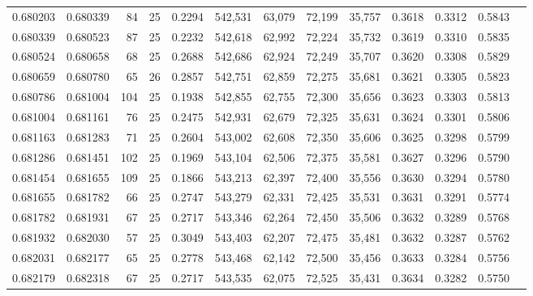 \begin{tabular}{rrrrrrrrrrrrr}
0.680203 & 0.680339 &    84 &  25 &                                     0.2294 & 542,531 &  63,079 &  72,199 &  35,757 & 0.3618 & 0.3312 & 0.5843 \\
0.680339 & 0.680523 &    87 &  25 &                                     0.2232 & 542,618 &  62,992 &  72,224 &  35,732 & 0.3619 & 0.3310 & 0.5835 \\
0.680524 & 0.680658 &    68 &  25 &                                     0.2688 & 542,686 &  62,924 &  72,249 &  35,707 & 0.3620 & 0.3308 & 0.5829 \\
0.680659 & 0.680780 &    65 &  26 &                                     0.2857 & 542,751 &  62,859 &  72,275 &  35,681 & 0.3621 & 0.3305 & 0.5823 \\
0.680786 & 0.681004 &   104 &  25 &                                     0.1938 & 542,855 &  62,755 &  72,300 &  35,656 & 0.3623 & 0.3303 & 0.5813 \\
0.681004 & 0.681161 &    76 &  25 &                                     0.2475 & 542,931 &  62,679 &  72,325 &  35,631 & 0.3624 & 0.3301 & 0.5806 \\
0.681163 & 0.681283 &    71 &  25 &                                     0.2604 & 543,002 &  62,608 &  72,350 &  35,606 & 0.3625 & 0.3298 & 0.5799 \\
0.681286 & 0.681451 &   102 &  25 &                                     0.1969 & 543,104 &  62,506 &  72,375 &  35,581 & 0.3627 & 0.3296 & 0.5790 \\
0.681454 & 0.681655 &   109 &  25 &                                     0.1866 & 543,213 &  62,397 &  72,400 &  35,556 & 0.3630 & 0.3294 & 0.5780 \\
0.681655 & 0.681782 &    66 &  25 &                                     0.2747 & 543,279 &  62,331 &  72,425 &  35,531 & 0.3631 & 0.3291 & 0.5774 \\
0.681782 & 0.681931 &    67 &  25 &                                     0.2717 & 543,346 &  62,264 &  72,450 &  35,506 & 0.3632 & 0.3289 & 0.5768 \\
0.681932 & 0.682030 &    57 &  25 &                                     0.3049 & 543,403 &  62,207 &  72,475 &  35,481 & 0.3632 & 0.3287 & 0.5762 \\
0.682031 & 0.682177 &    65 &  25 &                                     0.2778 & 543,468 &  62,142 &  72,500 &  35,456 & 0.3633 & 0.3284 & 0.5756 \\
0.682179 & 0.682318 &    67 &  25 &                                     0.2717 & 543,535 &  62,075 &  72,525 &  35,431 & 0.3634 & 0.3282 & 0.5750 \\

\end{tabular}
